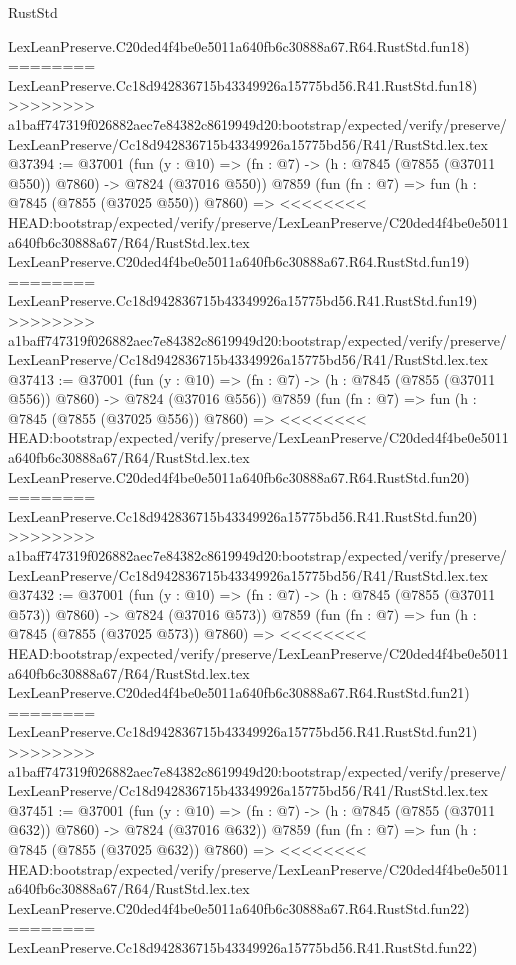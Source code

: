 \begin{lexlean}{RustStd}
\begin{coremodule}
{\begin{coremodule}
{{{{{{{{{{{{{{{{{{{{{{{{{{{{{{{{{{{{{{{{{{{{{{{{{{{{{{    LexLeanPreserve.C20ded4f4be0e5011a640fb6c30888a67.R64.RustStd.fun18)
========
    LexLeanPreserve.Cc18d942836715b43349926a15775bd56.R41.RustStd.fun18)
>>>>>>>> a1baff747319f026882aec7e84382c8619949d20:bootstrap/expected/verify/preserve/LexLeanPreserve/Cc18d942836715b43349926a15775bd56/R41/RustStd.lex.tex
@37394 := @37001
    (fun (y : @10) => (fn : @7) -> (h : @7845 (@7855 (@37011 @550)) @7860) -> @7824 (@37016 @550))
    @7859
    (fun (fn : @7) =>
    fun (h : @7845 (@7855 (@37025 @550)) @7860) =>
<<<<<<<< HEAD:bootstrap/expected/verify/preserve/LexLeanPreserve/C20ded4f4be0e5011a640fb6c30888a67/R64/RustStd.lex.tex
    LexLeanPreserve.C20ded4f4be0e5011a640fb6c30888a67.R64.RustStd.fun19)
========
    LexLeanPreserve.Cc18d942836715b43349926a15775bd56.R41.RustStd.fun19)
>>>>>>>> a1baff747319f026882aec7e84382c8619949d20:bootstrap/expected/verify/preserve/LexLeanPreserve/Cc18d942836715b43349926a15775bd56/R41/RustStd.lex.tex
@37413 := @37001
    (fun (y : @10) => (fn : @7) -> (h : @7845 (@7855 (@37011 @556)) @7860) -> @7824 (@37016 @556))
    @7859
    (fun (fn : @7) =>
    fun (h : @7845 (@7855 (@37025 @556)) @7860) =>
<<<<<<<< HEAD:bootstrap/expected/verify/preserve/LexLeanPreserve/C20ded4f4be0e5011a640fb6c30888a67/R64/RustStd.lex.tex
    LexLeanPreserve.C20ded4f4be0e5011a640fb6c30888a67.R64.RustStd.fun20)
========
    LexLeanPreserve.Cc18d942836715b43349926a15775bd56.R41.RustStd.fun20)
>>>>>>>> a1baff747319f026882aec7e84382c8619949d20:bootstrap/expected/verify/preserve/LexLeanPreserve/Cc18d942836715b43349926a15775bd56/R41/RustStd.lex.tex
@37432 := @37001
    (fun (y : @10) => (fn : @7) -> (h : @7845 (@7855 (@37011 @573)) @7860) -> @7824 (@37016 @573))
    @7859
    (fun (fn : @7) =>
    fun (h : @7845 (@7855 (@37025 @573)) @7860) =>
<<<<<<<< HEAD:bootstrap/expected/verify/preserve/LexLeanPreserve/C20ded4f4be0e5011a640fb6c30888a67/R64/RustStd.lex.tex
    LexLeanPreserve.C20ded4f4be0e5011a640fb6c30888a67.R64.RustStd.fun21)
========
    LexLeanPreserve.Cc18d942836715b43349926a15775bd56.R41.RustStd.fun21)
>>>>>>>> a1baff747319f026882aec7e84382c8619949d20:bootstrap/expected/verify/preserve/LexLeanPreserve/Cc18d942836715b43349926a15775bd56/R41/RustStd.lex.tex
@37451 := @37001
    (fun (y : @10) => (fn : @7) -> (h : @7845 (@7855 (@37011 @632)) @7860) -> @7824 (@37016 @632))
    @7859
    (fun (fn : @7) =>
    fun (h : @7845 (@7855 (@37025 @632)) @7860) =>
<<<<<<<< HEAD:bootstrap/expected/verify/preserve/LexLeanPreserve/C20ded4f4be0e5011a640fb6c30888a67/R64/RustStd.lex.tex
    LexLeanPreserve.C20ded4f4be0e5011a640fb6c30888a67.R64.RustStd.fun22)
========
    LexLeanPreserve.Cc18d942836715b43349926a15775bd56.R41.RustStd.fun22)
}}}}}}}}}}}}}}}}}}}}}}}}}}}}}}}}}}}}}}}}}}}}}}}}}}}}}}
\end{coremodule}}
\end{coremodule}
\end{lexlean}
